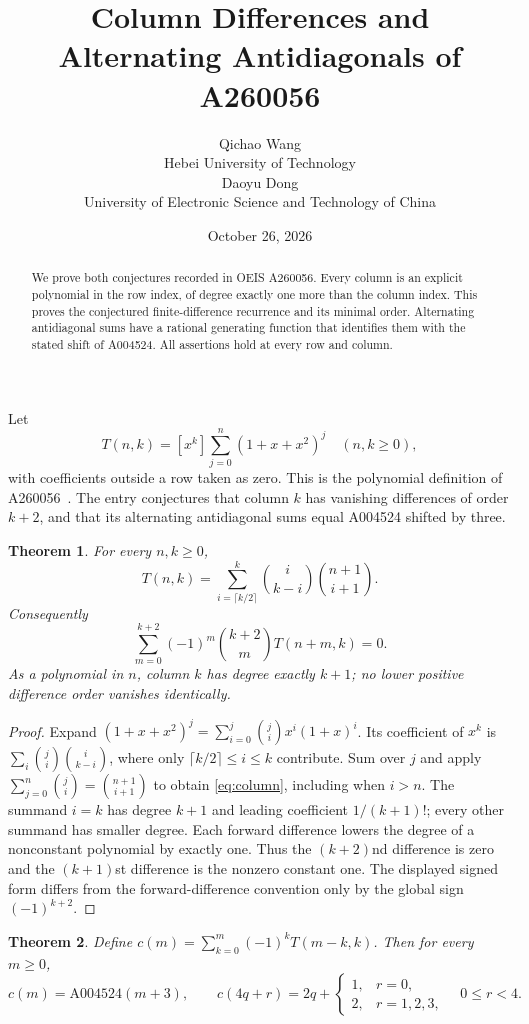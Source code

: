 \documentclass[10pt]{article}
\title{Column Differences and Alternating Antidiagonals of A260056}
\author{Qichao Wang\\{\small Hebei University of Technology}\\[.3em]Daoyu Dong\\{\small University of Electronic Science and Technology of China}}
\date{October 26, 2026}
\newtheorem{theorem}{Theorem}
\begin{document}
\maketitle
\begin{abstract}
We prove both conjectures recorded in OEIS A260056. Every column is
an explicit polynomial in the row index, of degree exactly one more
than the column index. This proves the conjectured finite-difference
recurrence and its minimal order. Alternating antidiagonal sums have
a rational generating function that identifies them with the stated
shift of A004524. All assertions hold at every row and column.
\end{abstract}
Let
\[
 T(n,k)=[x^k]\sum_{j=0}^n(1+x+x^2)^j\quad(n,k\ge0),
\]
with coefficients outside a row taken as zero. This is the polynomial
definition of A260056~\cite{target}. The entry conjectures that column
$k$ has vanishing differences of order $k+2$, and that its alternating
antidiagonal sums equal A004524 shifted by three.
\begin{theorem}
For every $n,k\ge0$,
\begin{equation}\label{eq:column}
 T(n,k)=\sum_{i=\lceil k/2\rceil}^{k}
   \binom{i}{k-i}\binom{n+1}{i+1}.
\end{equation}
Consequently
\[
 \sum_{m=0}^{k+2}(-1)^m\binom{k+2}{m}T(n+m,k)=0.
\]
As a polynomial in $n$, column $k$ has degree exactly $k+1$;
no lower positive difference order vanishes identically.
\end{theorem}
\begin{proof}
Expand $(1+x+x^2)^j=\sum_{i=0}^j\binom ji x^i(1+x)^i$.
Its coefficient of $x^k$ is
$\sum_i\binom ji\binom i{k-i}$, where only
$\lceil k/2\rceil\le i\le k$ contribute. Sum over $j$ and apply
$\sum_{j=0}^n\binom ji=\binom{n+1}{i+1}$ to obtain
\eqref{eq:column}, including when $i>n$.
The summand $i=k$ has degree $k+1$ and leading coefficient
$1/(k+1)!$; every other summand has smaller degree.
Each forward difference lowers the degree of a nonconstant
polynomial by exactly one. Thus the $(k+2)$nd difference is zero
and the $(k+1)$st difference is the nonzero constant one.
The displayed signed form differs from the forward-difference
convention only by the global sign $(-1)^{k+2}$.
\end{proof}
\begin{theorem}
Define $c(m)=\sum_{k=0}^m(-1)^kT(m-k,k)$. Then for every $m\ge0$,
\[
 c(m)=\mathrm{A004524}(m+3),\qquad
 c(4q+r)=2q+\begin{cases}1,&r=0,\\2,&r=1,2,3,\end{cases}
 \quad 0\le r<4.
\]
\end{theorem}
\end{document}
